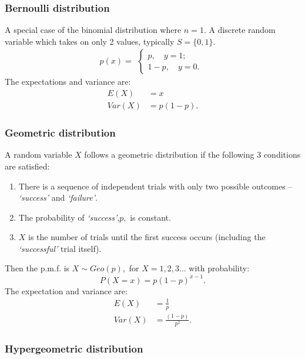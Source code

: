 \documentclass[12pt, a4paper]{article}
\theoremstyle{definition}
\theoremstyle{plain}
\begin{document}
\subsubsection{Bernoulli distribution}

A special case of the binomial distribution where $n=1.$ A discrete random variable which takes on only 2 values, typically $S = \{0, 1\}.$ 
$$p(x)=\begin{aligned}
\begin{cases} 
p,  \quad y=1;\\ 
1-p, \quad y=0. 
\end{cases}
\end{aligned}$$ The expectations and variance are: $$\begin{aligned}
E(X)&=x\\
Var(X)&=p(1-p).
\end{aligned}$$

\subsubsection{Geometric distribution}

A random variable $X$ follows a geometric distribution if the following $3$ conditions are satisfied: \begin{enumerate}
	
	\item There is a sequence of independent trials with only two possible outcomes -- \textit{`success'} and \textit{`failure'}.

	\item The probability of \textit{`success'},$p,$ is constant.

	\item $X$ is the number of trials until the first success occurs (including the \textit{`successful'} trial itself).

\end{enumerate} Then the p.m.f. is $X \sim Geo(p),$ for $X=1,2,3\ldots$ with probability: $$P(X=x)=p(1-p)^{x-1}.$$ The expectation and variance are: $$\begin{aligned}E(X)&=\frac{1}{p} \\ Var(X)&=\frac{(1-p)}{p^2}.\end{aligned}$$

\subsubsection{Hypergeometric distribution}
\end{document}
